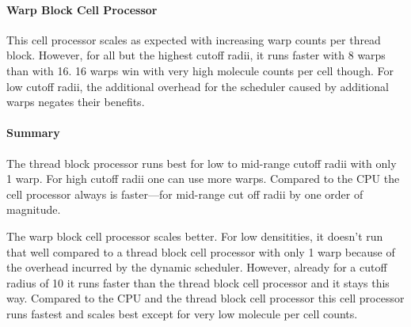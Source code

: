 \paragraph{Warp Block Cell Processor}
This cell processor scales as expected with increasing warp counts per thread block. However, for all but the highest cutoff radii, it runs faster with 8 warps than with 16. 16 warps win with very high molecule counts per cell though.
For low cutoff radii, the additional overhead for the scheduler caused by additional warps negates their benefits.

\paragraph{Summary}
The thread block processor runs best for low to mid-range cutoff radii with only 1 warp. For high cutoff radii one can use more warps.
Compared to the CPU the cell processor always is faster---for mid-range cut off radii by one order of magnitude.

The warp block cell processor scales better. For low densitities, it doesn't run that well compared to a thread block cell processor with only 1 warp because of the overhead incurred by the dynamic scheduler.
However, already for a cutoff radius of 10 it runs faster than the thread block cell processor and it stays this way.
Compared to the CPU and the thread block cell processor this cell processor runs fastest and scales best except for very low molecule per cell counts.

